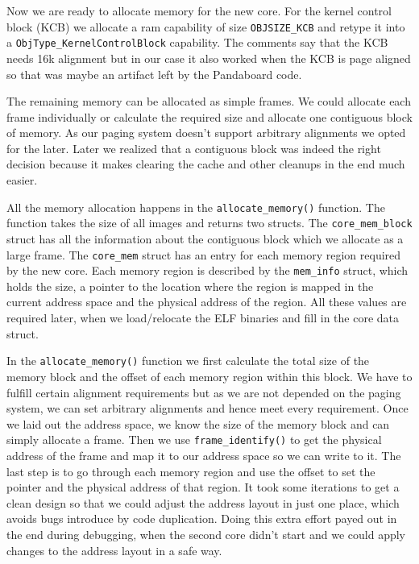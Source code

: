 Now we are ready to allocate memory for the new core. For the kernel control block (KCB)
we allocate a ram capability of size \verb|OBJSIZE_KCB| and retype it into a
\verb|ObjType_KernelControlBlock| capability. The comments say that the KCB needs 16k
alignment but in our case it also worked when the KCB is page aligned so that was maybe an
artifact left by the Pandaboard code.

The remaining memory can be allocated as simple frames.
We could allocate each frame individually or calculate the required size and allocate one
contiguous block of memory. As our paging system doesn't support arbitrary alignments we opted
for the later. Later we realized that a contiguous block was indeed the right decision because
it makes clearing the cache and other cleanups in the end much easier.

All the memory allocation happens in the \verb|allocate_memory()| function. The function takes
the size of all images and returns two structs. The \verb|core_mem_block| struct has all the
information about the contiguous block which we allocate as a large frame. The \verb|core_mem|
struct has an entry for each memory region required by the new core. Each memory region is
described by the \verb|mem_info| struct, which holds the size, a pointer to the location where
the region is mapped in the current address space and the physical address of the region. All these
values are required later, when we load/relocate the ELF binaries and fill in the core data struct.

In the \verb|allocate_memory()| function we first calculate the total size of the memory block and
the offset of each memory region within this block. We have to fulfill certain alignment requirements
but as we are not depended on the paging system, we can set arbitrary alignments and hence meet
every requirement. Once we laid out the address space, we know the size of the memory block and can
simply allocate a frame. Then we use \verb|frame_identify()| to get the physical address of the frame
and map it to our address space so we can write to it. The last step is to go through each memory region
and use the offset to set the pointer and the physical address of that region. It took some iterations
to get a clean design so that we could adjust the address layout in just one place, which avoids bugs
introduce by code duplication. Doing this extra effort payed out in the end during debugging, when the
second core didn't start and we could apply changes to the address layout in a safe way.

